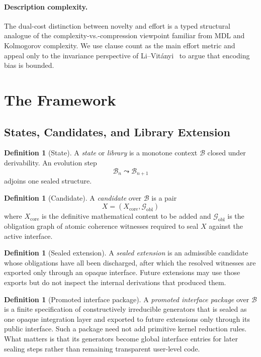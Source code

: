 \documentclass[11pt,a4paper]{article}
\theoremstyle{plain}
\theoremstyle{definition}
\newtheorem{definition}[theorem]{Definition}
\theoremstyle{remark}
\newcommand{\B}{\mathcal{B}}
\newcommand{\Gcal}{\mathcal{G}}
\begin{document}
\paragraph{Description complexity.}
The dual-cost distinction between novelty and effort is a typed structural analogue of the complexity-vs.-compression viewpoint familiar from MDL and Kolmogorov complexity.  We use clause count as the main effort metric and appeal only to the invariance perspective of Li--Vit\'anyi~\cite{kolmogorov} to argue that encoding bias is bounded.

\section{The Framework}
\label{sec:framework}

\subsection{States, Candidates, and Library Extension}

\begin{definition}[State]
\label{def:state}
A \emph{state} or \emph{library} is a monotone context $\B$ closed under derivability.  An evolution step
\[
  \B_n \leadsto \B_{n+1}
\]
adjoins one sealed structure.
\end{definition}

\begin{definition}[Candidate]
\label{def:candidate}
A \emph{candidate} over $\B$ is a pair
\[
  X=(X_{\mathrm{core}},\Gcal_{\mathrm{obl}})
\]
where $X_{\mathrm{core}}$ is the definitive mathematical content to be added and $\Gcal_{\mathrm{obl}}$ is the obligation graph of atomic coherence witnesses required to seal $X$ against the active interface.
\end{definition}

\begin{definition}[Sealed extension]
\label{def:sealed}
A \emph{sealed extension} is an admissible candidate whose obligations have all been discharged, after which the resolved witnesses are exported only through an opaque interface.  Future extensions may use those exports but do not inspect the internal derivations that produced them.
\end{definition}

\begin{definition}[Promoted interface package]
\label{def:promoted-api}
A \emph{promoted interface package} over $\B$ is a finite specification of constructively irreducible generators that is sealed as one opaque integration layer and exported to future extensions only through its public interface.  Such a package need not add primitive kernel reduction rules.  What matters is that its generators become global interface entries for later sealing steps rather than remaining transparent user-level code.
\end{definition}
\end{document}
